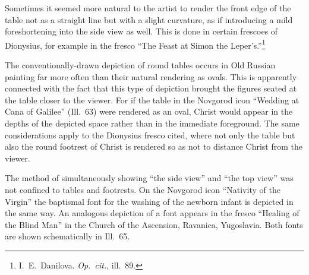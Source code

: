 

Sometimes it seemed more natural to the artist to render the front edge of the table
not as a straight line but with a slight curvature, as if introducing a mild foreshortening
into the side view as well.  This is done in certain frescoes of Dionysius, for example
in the fresco ``The Feast at Simon the Leper's.''\footnote{I.~E.~Danilova.
  \emph{Op.~cit.}, ill.~89.}

The conventionally-drawn depiction of round tables occurs in Old Russian painting far
more often than their natural rendering as ovals.  This is apparently connected with the
fact that this type of depiction brought the figures seated at the table closer to the
viewer.  For if the table in the Novgorod icon ``Wedding at Cana of Galilee'' (Ill.~63)
were rendered as an oval, Christ would appear in the depths of the depicted space rather
than in the immediate foreground.  The same considerations apply to the Dionysius fresco
cited, where not only the table but also the round footrest of Christ is rendered so as
not to distance Christ from the viewer.


The method of simultaneously showing ``the side view'' and ``the top view'' was not
confined to tables and footrests.  On the Novgorod icon ``Nativity of the Virgin'' the
baptismal font for the washing of the newborn infant is depicted in the same way.  An
analogous depiction of a font appears in the fresco ``Healing of the Blind Man'' in the
Church of the Ascension, Ravanica, Yugoslavia.  Both fonts are shown schematically in
Ill.~65.



